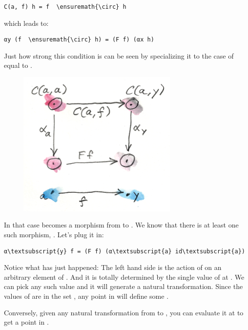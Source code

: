 \begin{Verbatim}[commandchars=\\\{\}]
C(a, f) h = f  \ensuremath{\circ} h
\end{Verbatim}
which leads to:

\begin{Verbatim}[commandchars=\\\{\}]
αy (f  \ensuremath{\circ} h) = (F f) (αx h)
\end{Verbatim}
Just how strong this condition is can be seen by specializing it to the
case of  equal to .

\begin{figure}[H]
\centering
\includegraphics[width=3.12500in]{images/yoneda2.png}
\end{figure}

\noindent
In that case  becomes a morphism from  to
. We know that there is at least one such morphism,
. Let's plug it in:

\begin{Verbatim}[commandchars=\\\{\}]
α\textsubscript{y} f = (F f) (α\textsubscript{a} id\textsubscript{a})
\end{Verbatim}
Notice what has just happened: The left hand side is the action of
 on an arbitrary element  of . And
it is totally determined by the single value of  at
. We can pick any such value and it will generate a natural
transformation. Since the values of  are in the set
, any point in  will define some .

Conversely, given any natural transformation  from
 to , you can evaluate it at  to
get a point in .

